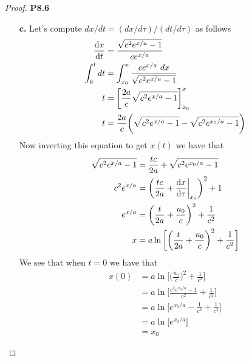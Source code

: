 \documentclass[11pt]{article}
\theoremstyle{definition}
\begin{document}
\begin{proof}{\textbf{P8.6}}
\begin{itemize}
        \item [\textbf{c.}] Let's compute $dx/dt = (dx/d\tau)/(dt/d\tau)$ as
        follows
        \begin{align*}
            \derivative{x}{t} &= \frac{\sqrt{c^2 e^{x/a} - 1}}{ce^{x/a}}\\
            \int_0^t dt &= \int_{x_0}^x \frac{ce^{x/a}~dx}{\sqrt{c^2 e^{x/a} - 1}}\\
            t &= \bigg[\frac{2a}{c}\sqrt{c^2 e^{x/a} - 1}\bigg]_{x_0}^x\\
            t &= \frac{2a}{c}
            \bigg(\sqrt{c^2 e^{x/a} - 1} - \sqrt{c^2 e^{x_0/a} - 1}\bigg)
        \end{align*}
        Now inverting this equation to get $x(t)$ we have that
        \begin{align*}
            \sqrt{c^2 e^{x/a} - 1}
            &= \frac{tc}{2a} + \sqrt{c^2 e^{x_0/a} - 1}\\
            c^2 e^{x/a} &= \bigg(\frac{tc}{2a}
            + \derivative{x}{\tau}\bigg|_{x_0}\bigg)^2 + 1\\
            e^{x/a} &=
            \bigg(\frac{t}{2a} + \frac{u_0}{c}\bigg)^2 + \frac{1}{c^2}\\
            x &= a\ln\bigg[\bigg(\frac{t}{2a} + \frac{u_0}{c}\bigg)^2
            + \frac{1}{c^2}\bigg]
        \end{align*}
        We see that when $t=0$ we have that
        \begin{align*}
            x(0) &= a\ln\bigg[\bigg(\frac{u_0}{c}\bigg)^2
            + \frac{1}{c^2}\bigg]\\
            &= a\ln\bigg[\frac{c^2 e^{x_0/a} - 1}{c^2}
            + \frac{1}{c^2}\bigg]\\
            &= a\ln\bigg[e^{x_0/a}-\frac{1}{c^2} + \frac{1}{c^2}\bigg]\\
            &= a\ln\bigg[e^{x_0/a}\bigg]\\
            &= x_0
        \end{align*}


\end{itemize}
\end{proof}
\end{document}
